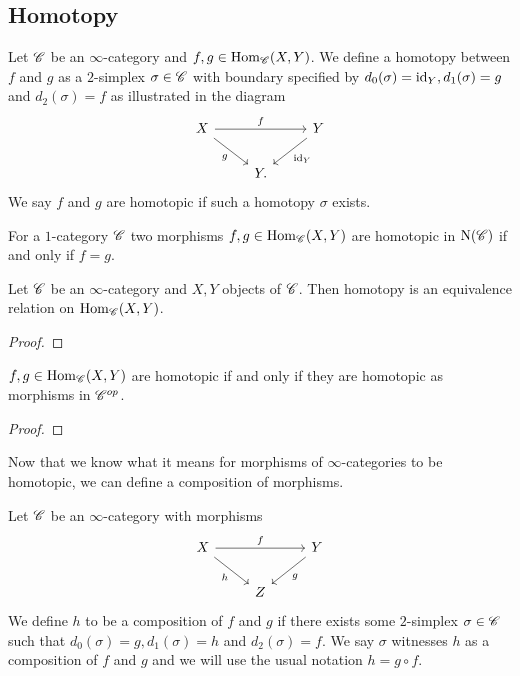 \documentclass[../../thesis.tex]{subfiles}
\begin{document}
\subsection{Homotopy}
\begin{definition}
    Let $\mathscr{C}$ be an $\infty$-category and $f,g \in \mathrm{Hom}_{\mathscr{C}}(X,Y)$.
    We define a homotopy between $f$ and $g$ as a $2$-simplex $\sigma \in \mathscr{C}$ with boundary specified by $d_0(\sigma) = \operatorname{id}_Y, d_1(\sigma) = g$ and $d_2(\sigma)=f$ as illustrated in the diagram
    \[\begin{tikzcd}
            X && Y \\
            & Y
            \arrow["f", from=1-1, to=1-3]
            \arrow["g"', from=1-1, to=2-2]
            \arrow["{\id_Y}", from=1-3, to=2-2].
        \end{tikzcd}\]
    We say $f$ and $g$ are homotopic if such a homotopy $\sigma$ exists.
\end{definition}
\begin{example}
    For a $1$-category $\mathscr{C}$ two morphisms $f,g \in \mathrm{Hom}_{\mathscr{C}}(X,Y)$ are homotopic in $\mathrm{N}(\mathscr{C})$ if and only if $f=g$.
\end{example}
\begin{proposition}
    Let $\mathscr{C}$ be an $\infty$-category and $X,Y$ objects of $\mathscr{C}$.
    Then homotopy is an equivalence relation on $\mathrm{Hom}_{\mathscr{C}}(X,Y)$.
\end{proposition}
\begin{proof}
\end{proof}
\begin{proposition}
    $f,g \in \mathrm{Hom}_{\mathscr{C}}(X,Y)$ are homotopic if and only if they are homotopic as morphisms in $\mathscr{C}^{op}$.
\end{proposition}
\begin{proof}
\end{proof}
Now that we know what it means for morphisms of $\infty$-categories to be homotopic, we can define a composition of morphisms.
\begin{definition}
    Let $\mathscr{C}$ be an $\infty$-category with morphisms
    \[\begin{tikzcd}
            X && Y \\
            & Z
            \arrow["f", from=1-1, to=1-3]
            \arrow["g", from=1-3, to=2-2]
            \arrow["h"', from=1-1, to=2-2]
        \end{tikzcd}\]
    We define $h$ to be a composition of $f$ and $g$ if there exists some $2$-simplex $\sigma \in \mathscr{C}$ such that $d_0(\sigma) = g, d_1(\sigma)=h$ and $d_2(\sigma)=f$.
    We say $\sigma$ witnesses $h$ as a composition of $f$ and $g$ and we will use the usual notation $h = g \circ f$.
\end{definition}
\end{document}
